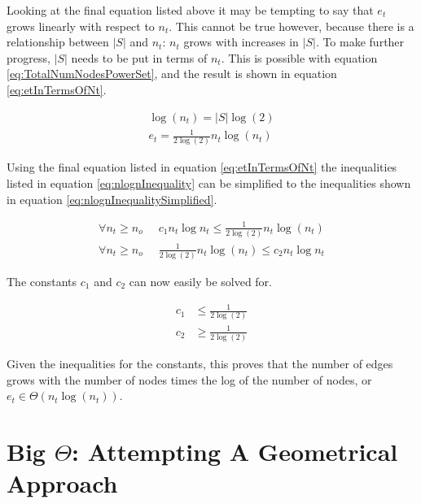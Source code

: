 \documentclass{article}
\begin{document}
Looking at the final equation listed above it may be tempting to say that $e_t$ grows linearly with respect to $n_t$. This cannot be true however, because there is a relationship between $|S|$ and $n_t$: $n_t$ grows with increases in $|S|$. To make further progress, $|S|$ needs to be put in terms of $n_t$. This is possible with equation \ref{eq:TotalNumNodesPowerSet}, and the result is shown in equation \ref{eq:etInTermsOfNt}.

\begin{equation}
    \begin{split}
        \log(n_t)=|S|\log(2) \\
        e_t=\frac{1}{2\log(2)}n_t\log(n_t)
    \end{split}
    \label{eq:etInTermsOfNt}
\end{equation}

Using the final equation listed in equation \ref{eq:etInTermsOfNt} the inequalities listed in equation \ref{eq:nlognInequality} can be simplified to the inequalities shown in equation \ref{eq:nlognInequalitySimplified}.

\begin{equation}
    \begin{split}
        \forall n_t\ge n_o \;\; &
        c_1 n_t \log n_t \le \frac{1}{2\log(2)}n_t\log(n_t)
        \\
        \forall n_t\ge n_o \;\; &
        \frac{1}{2\log(2)}n_t\log(n_t) \le c_2 n_t \log n_t
    \end{split}
    \label{eq:nlognInequalitySimplified}
\end{equation}

The constants $c_1$ and $c_2$ can now easily be solved for.

\begin{equation}
    \begin{split}
        c_1 &\le \frac{1}{2\log(2)}
        \\
        c_2 &\ge \frac{1}{2\log(2)}
    \end{split}
    \label{eq:BoundardInequalities}
\end{equation}

Given the inequalities for the constants, this proves that the number of edges grows with the number of nodes times the log of the number of nodes, or $e_t\in \Theta(n_t\log(n_t))$.

\section{Big $\Theta$: Attempting A Geometrical Approach}
\label{sec:TigherBoundGeometricalApproach}
\end{document}

